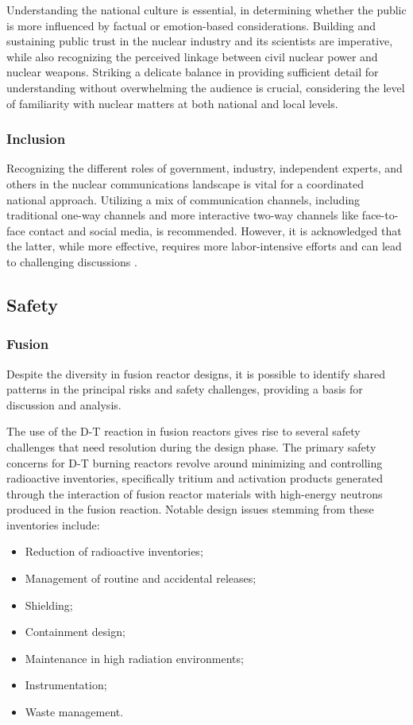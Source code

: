 Understanding the national culture is essential, in determining whether the public is more influenced by factual or emotion-based considerations. Building and sustaining public trust in the nuclear industry and its scientists are imperative, while also recognizing the perceived linkage between civil nuclear power and nuclear weapons. Striking a delicate balance in providing sufficient detail for understanding without overwhelming the audience is crucial, considering the level of familiarity with nuclear matters at both national and local levels.

\subsubsection{Inclusion}

Recognizing the different roles of government, industry, independent experts, and others in the nuclear communications landscape is vital for a coordinated national approach. Utilizing a mix of communication channels, including traditional one-way channels and more interactive two-way channels like face-to-face contact and social media, is recommended. However, it is acknowledged that the latter, while more effective, requires more labor-intensive efforts and can lead to challenging discussions \cite{holmes2019developing}.


\subsection{Safety}

\subsubsection{Fusion}

Despite the diversity in fusion reactor designs, it is possible to identify shared patterns in the principal risks and safety challenges, providing a basis for discussion and analysis.

The use of the D-T reaction in fusion reactors gives rise to several safety challenges that need resolution during the design phase. The primary safety concerns for D-T burning reactors revolve around minimizing and controlling radioactive inventories, specifically tritium and activation products generated through the interaction of fusion reactor materials with high-energy neutrons produced in the fusion reaction.
Notable design issues stemming from these inventories include:
\begin{itemize}
    \item Reduction of radioactive inventories;
\item Management of routine and accidental releases; 
\item Shielding;
\item Containment design;
\item Maintenance in high radiation environments;
\item Instrumentation;
\item Waste management.
\end{itemize}


